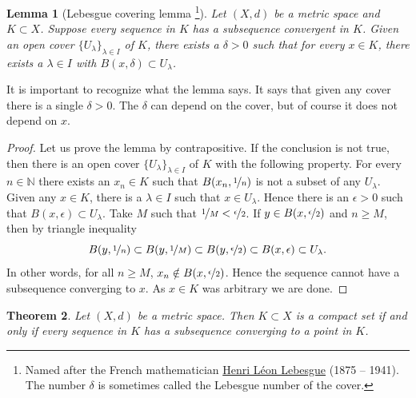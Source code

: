 \documentclass[12pt]{book}
\newcommand{\N}{{\mathbb{N}}}
\newcommand{\myindex}[1]{#1\index{#1}}
\theoremstyle{plain}
\newtheorem{thm}{Theorem}[section]
\newtheorem{lemma}[thm]{Lemma}
\theoremstyle{remark}
\theoremstyle{definition}
\theoremstyle{exercise}
\theoremstyle{example}
\begin{document}
\begin{lemma}[Lebesgue covering lemma%
\footnote{Named after the French mathematician
\href{http://en.wikipedia.org/wiki/Lebesgue}{Henri L\'eon Lebesgue}
(1875 -- 1941).
The number $\delta$ is sometimes called the \myindex{Lebesgue number} of the
cover.}]\label{ms:lebesgue}
Let $(X,d)$ be a metric space and $K \subset X$.  Suppose 
every sequence in $K$ has a subsequence convergent in $K$.  Given
an open cover $\{ U_\lambda \}_{\lambda \in I}$ of $K$, there exists a
$\delta > 0$ such that for every $x \in K$, there exists a $\lambda \in I$
with $B(x,\delta) \subset U_\lambda$.
\end{lemma}

It is important to recognize what the lemma says.  It says that given any
cover there is a single $\delta > 0$.  The $\delta$ can depend on the cover,
but of course it does not depend on $x$.

\begin{proof}
Let us prove the lemma by contrapositive.
If the conclusion is not true, then
there is
an open cover $\{ U_\lambda \}_{\lambda \in I}$ of $K$ with
the following property.
For every $n \in \N$ there exists an $x_n \in K$ such that
$B(x_n,\nicefrac{1}{n})$ is not a subset of any $U_\lambda$.
Given any $x \in K$, there is
a $\lambda \in I$ such that $x \in U_\lambda$.  Hence there
is an $\epsilon > 0$ 
such that $B(x,\epsilon) \subset U_\lambda$.  Take $M$ such that
$\nicefrac{1}{M} < \nicefrac{\epsilon}{2}$.  If $y \in 
B(x,\nicefrac{\epsilon}{2})$ and $n \geq M$, then
by triangle inequality
\begin{equation*}
B(y,\nicefrac{1}{n}) \subset
B(y,\nicefrac{1}{M}) \subset B(y,\nicefrac{\epsilon}{2}) \subset
B(x,\epsilon) \subset U_\lambda .
\end{equation*}
In other words, for all $n \geq M$, $x_n \notin B(x,\nicefrac{\epsilon}{2})$. 
Hence the sequence cannot have a subsequence converging to $x$.  As $x \in K$ was
arbitrary we are done.
\end{proof}

\begin{thm} \label{thm:mscompactisseqcpt}
Let $(X,d)$ be a metric space.  Then $K \subset X$ is a compact set if
and only if every sequence in $K$ has a subsequence converging to
a point in $K$.
\end{thm}
\end{document}
